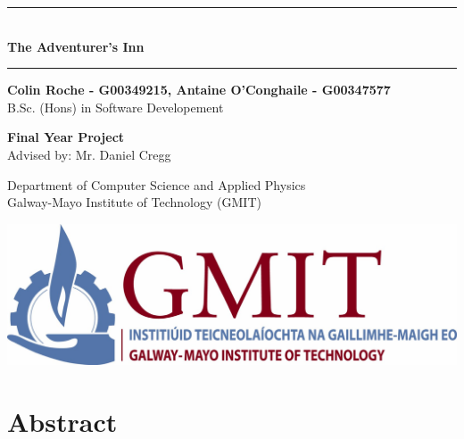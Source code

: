 \documentclass{report}
\newcommand{\projecttitle}{The Adventurer's Inn}
\newcommand{\projectauthor}{Colin Roche - G00349215, Antaine O'Conghaile - G00347577}
\newcommand{\projectadvisor}{Mr. Daniel Cregg}
\newcommand{\projectprogramme}{B.Sc. (Hons) in Software Developement}
\begin{document}
  \begin{titlepage}
  \begin{center}
    \begin{minipage}[t][4cm]{\textwidth}
      \centering
        \rule{\linewidth}{0.5mm} \\[0.4cm]
        { \LARGE \bfseries \projecttitle \\[0.4cm] }
        \rule{\linewidth}{0.5mm}
    \end{minipage}
    
    \begin{minipage}[c][4cm]{\textwidth}
      \centering
        \textbf{\projectauthor}\\[0.4cm]
        \projectprogramme
    \end{minipage}
    
    \begin{minipage}[c][3cm]{\textwidth}
      \centering
        \textbf{Final Year Project}\\[0.2cm]
        Advised by: \projectadvisor
    \end{minipage}
    
    \begin{minipage}[c][3.5cm]{\textwidth}
    \centering
      Department of Computer Science and Applied Physics\\[0.1cm]
      Galway-Mayo Institute of Technology (GMIT)
    \end{minipage}
    
    \begin{minipage}[b][4cm]{\textwidth}
      \centering
        \includegraphics[scale=0.15]{./img/gmitlogo.jpg}
    \end{minipage}
    
    \end{center}
  \end{titlepage}
   
  \setcounter{page}{1}
\tableofcontents

\chapter{Abstract}

\end{document}

